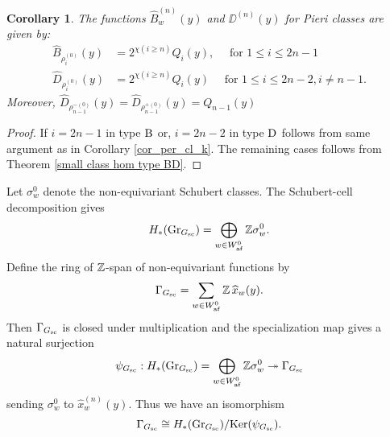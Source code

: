 \documentclass[a4paper]{amsart}
\newtheorem{cor}[thm]{Corollary}
\theoremstyle{remark}
\numberwithin{equation}{section}
\begin{document}
\begin{cor}\label{cor_per_cl}
The functions $\widehat{B}_w^{(n)}(y)$ and $\DD^{(n)}(y)$ for  Pieri classes are given by:
 \begin{align}\label{E:QB_n}
    {\widehat{B}}_{\rho_i^{(0)}}(y)&=2^{\chi(i\ge n)} Q_{i}(y),\quad \text{ for } 1\le i\le 2n-1\\
    \widehat{D}_{\rho_i^{(0)}}(y)&=2^{\chi(i\ge n)} Q_{i}(y) \quad \text{ for } 1\le i\le 2n-2, i\neq n-1.
\end{align}   
Moreover, $ \widehat{D}_{\rho_{n-1}^{-(0)}}(y)= \widehat{D}_{\rho_{n-1}^{+(0)}}(y)=Q_{n-1}(y)$
\end{cor}
\begin{proof}
 If $i=2n-1$ in type $\mathrm{B}_{}$ or, $i=2n-2$ in type $\mathrm{D}_{}$ follows from same argument as in Corollary \ref{cor_per_cl_k}. The remaining cases follows from Theorem \ref{small class hom type BD}. 
\end{proof}

Let \(\sigma_{w}^0\) denote the non-equivariant Schubert classes. The Schubert-cell decomposition gives
\[
H_*(\mathrm{Gr}_{G_{\mathrm{sc}}})
=\bigoplus_{w\in W_{\mathrm{af}}^0}\mathbb Z\sigma_w^0.
\]
Define the ring of $\mathbb{Z}$-span of non-equivariant functions by
\[\Gamma_{G_{\mathrm{sc}}}=\sum_{w\in W_{\mathrm{af}}^0}\mathbb{Z} \, \widehat{x}_{w}(y).\]
Then $\Gamma_{G_{\mathrm{sc}}}$ is closed under multiplication and the specialization map gives a natural surjection 
$$\psi_{G_{\mathrm{sc}}}: H_*(\mathrm{Gr}_{G_{\mathrm{sc}}})=\bigoplus_{w\in W_{\mathrm{af}}^0}
\mathbb{Z} \sigma_{w}^0
\twoheadrightarrow  \Gamma_{G_{\mathrm{sc}}}$$
sending $\sigma_{w}^0$ to $\widehat{x}_{w}^{(n)}(y)$. Thus we have an isomorphism 
$$\Gamma_{G_{\mathrm{sc}}}\cong {H_*(\mathrm{Gr}_{G_{\mathrm{sc}}})}/{\operatorname{Ker}(\psi_{G_{\mathrm{sc}}})}.$$
\end{document}
